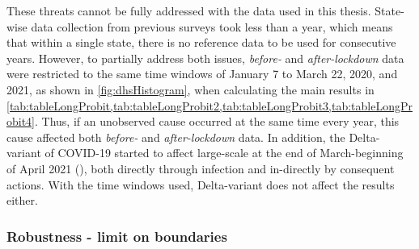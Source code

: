 \documentclass[12pt,a4paper,notitlepage]{article}
\begin{document}
These threats cannot be fully addressed with the data used in this thesis. State-wise data collection from previous surveys took less than a year, which means that within a single state, there is no reference data to be used for consecutive years. However, to partially address both issues, \textit{before-} and \textit{after-lockdown} data were restricted to the same time windows of January 7 to March 22, 2020, and 2021, as shown in \cref{fig:dhsHistogram}, when calculating the main results in \cref{tab:tableLongProbit,tab:tableLongProbit2,tab:tableLongProbit3,tab:tableLongProbit4}. Thus, if an unobserved cause occurred at the same time every year, this cause affected both \textit{before-} and \textit{after-lockdown} data. In addition, the Delta-variant of COVID-19 started to affect large-scale at the end of March-beginning of April 2021 (\citet{Salvatore:2022}), both directly through infection and in-directly by consequent actions. With the time windows used, Delta-variant does not affect the results either.

\subsubsection{Robustness - limit on boundaries} \label{subsubsec:limitOnBoundaries}
\end{document}

